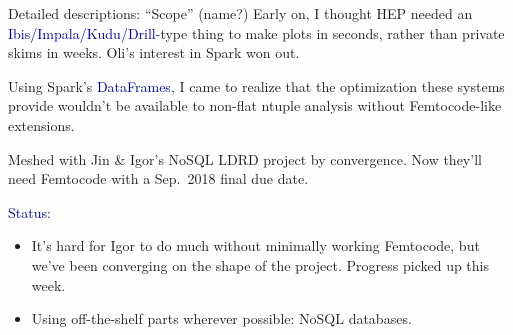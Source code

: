 \documentclass{beamer}
\begin{document}
\begin{frame}{Detailed descriptions: ``Scope'' (name?)}
\vspace{0.4 cm}
Early on, I thought HEP needed an \textcolor{darkblue}{Ibis/Impala/Kudu/Drill}-type thing to make plots in seconds, rather than private skims in weeks. Oli's interest in Spark won out.

\vspace{0.3 cm}
Using Spark's \textcolor{darkblue}{DataFrames}, I came to realize that the optimization these systems provide wouldn't be available to non-flat ntuple analysis without Femtocode-like extensions.

\vspace{0.3 cm}
Meshed with Jin \& Igor's NoSQL LDRD project by convergence. Now they'll need Femtocode with a Sep.\ 2018 final due date.

\vspace{0.4 cm}
\textcolor{darkblue}{Status:}
\begin{itemize}
\item It's hard for Igor to do much without minimally working Femtocode, but we've been converging on the shape of the project. Progress picked up this week.
\item Using off-the-shelf parts wherever possible: NoSQL databases.
\end{itemize}
\end{frame}
\end{document}
